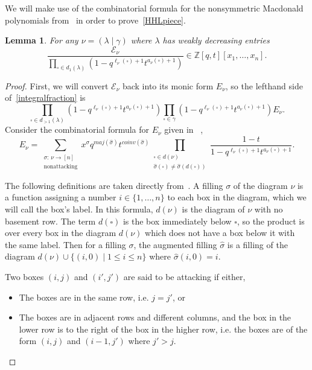 \documentclass[11pt]{article}
\newtheorem{lemm}[theo]{Lemma}
\theoremstyle{definition}
\numberwithin{equation}{section}
\newcommand{\Z}{\mathbb{Z}}
\newcommand{\nudom}{{( \lambda \mid \gamma )}}
\newcommand{\legnu}{{\ell_\nu(\square)}}
\newcommand{\armtwonu}{{a_\nu(\square)}}
\newcommand{\nonsymmetricprod}{\prod\limits_{\square \in \gamma}}
\newcommand{\dg}{d}
\begin{document}
We will make use of the combinatorial formula for the nonsymmetric Macdonald polynomials from~\cite{MR2405160} in order to prove~\eqref{HHLpiece}.
\begin{lemm}\label{redundancy} For any $\nu = \nudom$ where $\lambda$ has weakly decreasing entries 
\begin{equation}\label{integralfraction} \frac{\mathcal{E}_\nu}{\prod\limits_{ \square \in d_1(\lambda) }(1-q^{\legnu+1}t^{\armtwonu +1})} \in \Z[q,t][x_1, \dotsc, x_n]. \end{equation}
\end{lemm}
\begin{proof}
First, we will convert $\mathcal{E}_\nu$ back into its monic form $E_\nu$, so the lefthand side of~\eqref{integralfraction} is
\[\prod\limits_{\square \in d_{>1}(\lambda) }(1-q^{\legnu+1}t^{\armtwonu + 1}) \nonsymmetricprod(1-q^{\legnu+1}t^{\armtwonu + 1}) E_\nu.\]
Consider the combinatorial formula for $E_\nu$ given in ~\cite{MR2405160},
\[E_\nu = \sum\limits_{\substack{\sigma :\, \nu \to [n] \\ \text{nonattacking}}} x^\sigma q^{maj(\widehat{\sigma})}t^{coinv(\widehat{\sigma})} \prod\limits_{\substack{\square \in  \dg(\nu) \\ \widehat{\sigma}(\square) \neq \widehat{\sigma}(d(\square))}} \frac{1-t}{1-q^{\legnu+1} t^{\armtwonu+1}}.\]

The following definitions are taken directly from~\cite{MR2405160}. A filling $\sigma$ of the diagram $\nu$ is a function assigning a number $i\in \{1, \dotsc, n \} $ to each box in the diagram, which we will call the box's label. In this formula, $\dg(\nu)$ is the diagram of $\nu$ with no basement row. The term $d(\square)$ is the box immediately below $\square$, so the product is over every box in the diagram $\dg(\nu)$ which does not have a box below it with the same label. Then for a filling $\sigma$, the augmented filling $\widehat{\sigma}$ is a filling of the diagram $\dg(\nu) \cup \{ (i,0) \mid 1\leq i \leq n\}$ where $\widehat{\sigma}(i,0)=i$.

Two boxes $(i,j)$ and $(i',j')$ are said to be attacking if either,
\begin{itemize}
    \item The boxes are in the same row, i.e. $j = j'$, or
    \item The boxes are in adjacent rows and different columns, and the box in the lower row is to the right of the box in the higher row, i.e. the boxes are of the form $(i,j)$ and $(i-1,j')$ where $j' > j$.
\end{itemize}


\end{proof}
\end{document}
